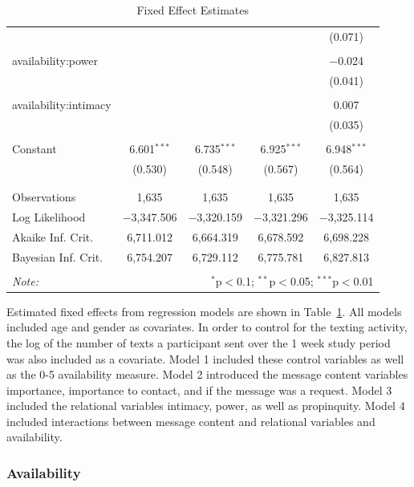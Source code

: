 \documentclass[12pt]{nuthesis}	%
\begin{document}
\begin{table}[!htbp]
\begin{tabular}{@{\extracolsep{5pt}}lcccc}
  &  &  &  & (0.071) \\ 
  & & & & \\ 
 availability:power &  &  &  & $-$0.024 \\ 
  &  &  &  & (0.041) \\ 
  & & & & \\ 
 availability:intimacy &  &  &  & 0.007 \\ 
  &  &  &  & (0.035) \\ 
  & & & & \\ 
 Constant & 6.601$^{***}$ & 6.735$^{***}$ & 6.925$^{***}$ & 6.948$^{***}$ \\ 
  & (0.530) & (0.548) & (0.567) & (0.564) \\ 
  & & & & \\ 
\hline \\[-1.8ex] 
Observations & 1,635 & 1,635 & 1,635 & 1,635 \\ 
Log Likelihood & $-$3,347.506 & $-$3,320.159 & $-$3,321.296 & $-$3,325.114 \\ 
Akaike Inf. Crit. & 6,711.012 & 6,664.319 & 6,678.592 & 6,698.228 \\ 
Bayesian Inf. Crit. & 6,754.207 & 6,729.112 & 6,775.781 & 6,827.813 \\ 
\hline 
\hline \\[-1.8ex] 
\textit{Note:}  & \multicolumn{4}{r}{$^{*}$p$<$0.1; $^{**}$p$<$0.05; $^{***}$p$<$0.01} \\ 
\end{tabular} 
  \caption{Fixed Effect Estimates} 
  \label{tab:fixed_effects} 
\end{table} 

Estimated fixed effects from regression models are shown in Table~\ref{tab:fixed_effects}. All models included age and gender as covariates. In order to control for the texting activity, the log of the number of texts a participant sent over the 1 week study period was also included as a covariate. Model 1 included these control variables as well as the 0-5 availability measure. Model 2 introduced the message content variables importance, importance to contact, and if the message was a request. Model 3 included the relational variables intimacy, power, as well as propinquity. Model 4 included interactions between message content and relational variables and availability.

\subsubsection{Availability}
\end{document}
